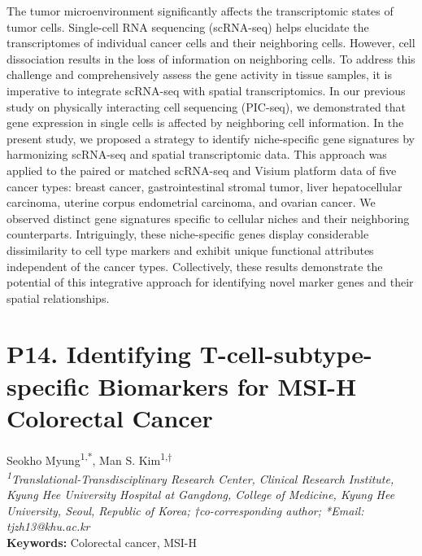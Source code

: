 \noindent
The tumor microenvironment significantly affects the transcriptomic states of tumor cells. Single-cell RNA sequencing (scRNA-seq) helps elucidate the transcriptomes of individual cancer cells and their neighboring cells. However, cell dissociation results in the loss of information on neighboring cells. To address this challenge and comprehensively assess the gene activity in tissue samples, it is imperative to integrate scRNA-seq with spatial transcriptomics. In our previous study on physically interacting cell sequencing (PIC-seq), we demonstrated that gene expression in single cells is affected by neighboring cell information. In the present study, we proposed a strategy to identify niche-specific gene signatures by harmonizing scRNA-seq and spatial transcriptomic data. This approach was applied to the paired or matched scRNA-seq and Visium platform data of five cancer types: breast cancer, gastrointestinal stromal tumor, liver hepatocellular carcinoma, uterine corpus endometrial carcinoma, and ovarian cancer. We observed distinct gene signatures specific to cellular niches and their neighboring counterparts. Intriguingly, these niche-specific genes display considerable dissimilarity to cell type markers and exhibit unique functional attributes independent of the cancer types. Collectively, these results demonstrate the potential of this integrative approach for identifying novel marker genes and their spatial relationships.
\newpage

\section*{P14. Identifying T-cell-subtype-specific Biomarkers for MSI-H Colorectal Cancer}

\begin{center}
Seokho Myung\textsuperscript{1,*}, Man S. Kim\textsuperscript{1,†} \\
\vspace{0.2cm}
\textit{\textsuperscript{1}Translational-Transdisciplinary Research Center, Clinical Research Institute, Kyung Hee University Hospital at Gangdong, College of Medicine, Kyung Hee University, Seoul, Republic of Korea; †co-corresponding author; *Email: tjzh13@khu.ac.kr} \\
\vspace{0.2cm}
\textbf{Keywords:} Colorectal cancer, MSI-H
\end{center}

